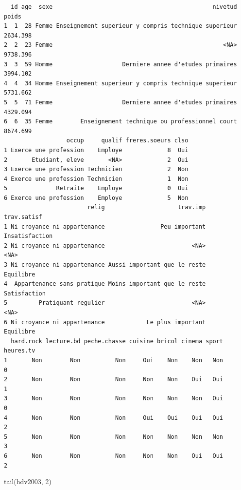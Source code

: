 \documentclass[
  letterpaper,
  DIV=11,
  numbers=noendperiod,
  oneside]{scrreprt}
\newenvironment{Shaded}{\begin{snugshade}}{\end{snugshade}}
\newcommand{\DecValTok}[1]{\textcolor[rgb]{0.68,0.00,0.00}{#1}}
\newcommand{\FunctionTok}[1]{\textcolor[rgb]{0.28,0.35,0.67}{#1}}
\newcommand{\NormalTok}[1]{\textcolor[rgb]{0.00,0.23,0.31}{#1}}
\begin{document}
\begin{verbatim}
  id age  sexe                                              nivetud    poids
1  1  28 Femme Enseignement superieur y compris technique superieur 2634.398
2  2  23 Femme                                                 <NA> 9738.396
3  3  59 Homme                    Derniere annee d'etudes primaires 3994.102
4  4  34 Homme Enseignement superieur y compris technique superieur 5731.662
5  5  71 Femme                    Derniere annee d'etudes primaires 4329.094
6  6  35 Femme        Enseignement technique ou professionnel court 8674.699
                  occup     qualif freres.soeurs clso
1 Exerce une profession    Employe             8  Oui
2       Etudiant, eleve       <NA>             2  Oui
3 Exerce une profession Technicien             2  Non
4 Exerce une profession Technicien             1  Non
5              Retraite    Employe             0  Oui
6 Exerce une profession    Employe             5  Non
                        relig                     trav.imp    trav.satisf
1 Ni croyance ni appartenance                Peu important Insatisfaction
2 Ni croyance ni appartenance                         <NA>           <NA>
3 Ni croyance ni appartenance Aussi important que le reste      Equilibre
4  Appartenance sans pratique Moins important que le reste   Satisfaction
5         Pratiquant regulier                         <NA>           <NA>
6 Ni croyance ni appartenance            Le plus important      Equilibre
  hard.rock lecture.bd peche.chasse cuisine bricol cinema sport heures.tv
1       Non        Non          Non     Oui    Non    Non   Non         0
2       Non        Non          Non     Non    Non    Oui   Oui         1
3       Non        Non          Non     Non    Non    Non   Oui         0
4       Non        Non          Non     Oui    Oui    Oui   Oui         2
5       Non        Non          Non     Non    Non    Non   Non         3
6       Non        Non          Non     Non    Non    Oui   Oui         2
\end{verbatim}

\begin{Shaded}
\begin{Highlighting}[]
\FunctionTok{tail}\NormalTok{(hdv2003, }\DecValTok{2}\NormalTok{)}
\end{Highlighting}
\end{Shaded}
\end{document}
